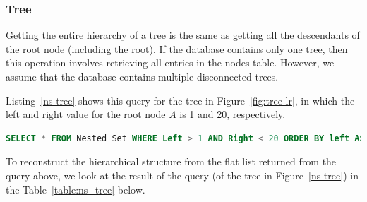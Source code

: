 




\subsubsection{Tree}

Getting the entire hierarchy of a tree is the same as getting all the descendants of the root node (including the root). If the database contains only one tree, then this operation involves retrieving all entries in the nodes table. However, we assume that the database contains multiple disconnected trees.

Listing~\ref{ns-tree} shows this query for the tree in Figure~\ref{fig:tree-lr}, in which the left and right value for the root node $A$ is 1 and 20, respectively.

\begin{lstlisting}[language=sql,caption={Query for Tree for tree $A$ via nested set model},label=ns-tree, float]
SELECT * FROM Nested_Set WHERE Left > 1 AND Right < 20 ORDER BY left ASC
\end{lstlisting}

To reconstruct the hierarchical structure from the flat list returned from the query above, we look at the result of the query (of the tree in Figure~\ref{ns-tree}) in the Table~\ref{table:ns_tree} below.

